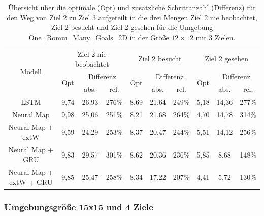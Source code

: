 \begin{table}
  \begin{tabular}{|c|c|c|c|c|c|c|c|c|c|}
    \hline
    \multirow{3}{*}{Modell} & \multicolumn{3}{|c|}{Ziel 2 nie beobachtet} & \multicolumn{3}{|c|}{Ziel 2 besucht} & \multicolumn{3}{|c|}{Ziel 2 gesehen} \\ \cline{2-10}
    & \multirow{2}{*}{Opt} & \multicolumn{2}{|c|}{Differenz} & \multirow{2}{*}{Opt} & \multicolumn{2}{|c|}{Differenz} & \multirow{2}{*}{Opt} & \multicolumn{2}{|c|}{Differenz} \\ \cline{3-4} \cline{6-7} \cline{9-10}
    & & abs. & rel. & & abs. & rel. & & abs. & rel. \\ \hline
    LSTM & 9,74 & 26,93 & 276\% & 8,69 & 21,64 & 249\% & 5,18 & 14,36 & 277\% \\ \hline
    Neural Map & 9,98 & 25,06 & 251\% & 8,21 & 21,68 & 264\% & 4,70 & 14,78 & 314\% \\ \hline
    Neural Map + extW & 9,59 & 24,29 & 253\% & 8,37 & 20,47 & 244\% & 5,51 & 14,12 & 256\% \\ \hline
    Neural Map + GRU & 9,83 & 29,57 & 301\% & 8,62 & 20,36 & 236\% & 5,85 & 8,68 & 148\% \\ \hline
    Neural Map + extW + GRU & 9,85 & 25,47 & 258\% & 8,34 & 17,22 & 207\% & 4,41 & 5,72 & 130\% \\ \hline
  \end{tabular}
  \caption{Übersicht über die optimale (Opt) und zusätzliche Schrittanzahl (Differenz) für den Weg von Ziel 2 zu Ziel 3 aufgeteilt in die drei Mengen \glqq Ziel 2 nie beobachtet\grqq{}, \glqq Ziel 2 besucht\grqq{} und \glqq Ziel 2 gesehen\grqq{} für die Umgebung \glqq One\_Romm\_Many\_Goals\_2D\grqq{} in der Größe $12 \times 12$ mit 3 Zielen.}
  \label{results12x12_2_to_3_per_M}
\end{table}



\subsubsection{Umgebungsgröße 15x15 und 4 Ziele}


